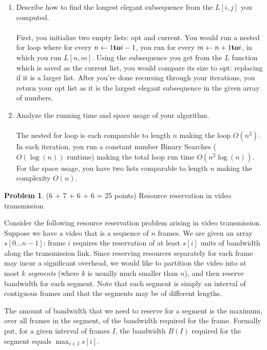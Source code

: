 \documentclass[11pt]{article}
\theoremstyle{definition}
\theoremstyle{theorem}
\newtheorem{prob}{Problem}
\begin{document}
\begin{enumerate}[label=(\alph*)]
	\item Describe how to find the longest elegant subsequence from the $L[i,j]$ you computed. \\\\
 First, you initialize two empty lists: opt and current. You would run a nested for loop where for every $n \gets 1 \KwTo i -1$, you run for every $m \gets n + 1 \KwTo i$, in which you run $L[n, m]$. Using the subsequence you get from the $L$ function which is saved as the current list, you would compare its size to opt: replacing if it is a larger list. After you're done recursing through your iterations, you return your opt list as it is the largest elegant subsequence in the given array of numbers.

	\item Analyze the running time and space usage of your algorithm. \\\\
 The nested for loop is each comparable to length $n$ making the loop $O(n^2)$. In each iteration, you run a constant number Binary Searches ($O(\log(n))$ runtime) making the total loop run time $O(n^2\log(n))$. For the space usage, you have two lists comparable to length $n$ making the complexity $O(n)$.
	
\end{enumerate}

\newpage

\begin{prob}
	(6 + 7 + 6 + 6 = 25 points) Resource reservation in video transmission
\end{prob}

Consider the following resource reservation problem arising in video
transmission.  Suppose we have a video that is a sequence of $n$
frames.  We are given an array $s[0\ldots n-1]$: frame $i$ requires
the reservation of at least $s[i]$ units of bandwidth along the
transmission link.  Since reserving resources separately for each
frame may incur a significant overhead, we would like to partition the
video into at most $k$ {\em segments}\/ (where $k$ is usually much
smaller than $n$), and then reserve bandwidth for each segment.  Note
that each segment is simply an interval of contiguous frames and that
the segments may be of different lengths.

The amount of bandwidth that we need to reserve for a segment is the
maximum, over all frames in the segment, of the bandwidth required for
the frame.  Formally put, for a given interval of frames $I$, the
bandwidth $B(I)$ required for the segment equals $\max_{i \in I}
s[i]$.
\end{document}
